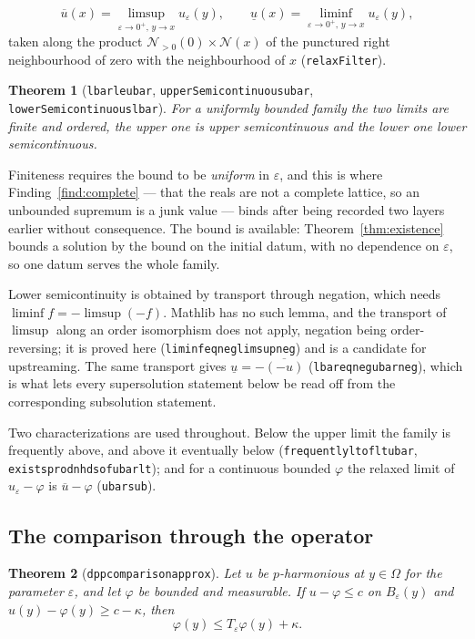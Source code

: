 \documentclass[11pt,reqno]{amsart}
\newcommand{\LEANREF}[1]{\texttt{\small\def\_{\textunderscore\allowbreak}#1}}
\newcommand{\eps}{\varepsilon}
\newcommand{\Op}{T_\eps}
\theoremstyle{plain}
\newtheorem{theorem}{Theorem}[section]
\theoremstyle{definition}
\begin{document}
\[
  \overline{u}(x) = \limsup_{\eps\to 0^+,\, y\to x} u_\eps(y),
  \qquad
  \underline{u}(x) = \liminf_{\eps\to 0^+,\, y\to x} u_\eps(y),
\]
taken along the product $\mathcal{N}_{>0}(0) \times \mathcal{N}(x)$ of the
punctured right neighbourhood of zero with the neighbourhood of $x$
(\LEANREF{relaxFilter}).

\begin{theorem}[\LEANREF{lbar\_le\_ubar},
\LEANREF{upperSemicontinuous\_ubar}, \LEANREF{lowerSemicontinuous\_lbar}]
\label{thm:relaxed}
For a uniformly bounded family the two limits are finite and ordered, the
upper one is upper semicontinuous and the lower one lower semicontinuous.
\end{theorem}

Finiteness requires the bound to be \emph{uniform} in $\eps$, and this is
where Finding~\ref{find:complete} --- that the reals are not a complete
lattice, so an unbounded supremum is a junk value --- binds after being
recorded two layers earlier without consequence. The bound is available:
Theorem~\ref{thm:existence} bounds a solution by the bound on the initial
datum, with no dependence on $\eps$, so one datum serves the whole family.

Lower semicontinuity is obtained by transport through negation, which needs
$\liminf f = -\limsup(-f)$. Mathlib has no such lemma, and the transport of
$\limsup$ along an order isomorphism does not apply, negation being
order-reversing; it is proved here (\LEANREF{liminf\_eq\_neg\_limsup\_neg})
and is a candidate for upstreaming. The same transport gives
$\underline{u} = -\overline{(-u)}$ (\LEANREF{lbar\_eq\_neg\_ubar\_neg}), which
is what lets every supersolution statement below be read off from the
corresponding subsolution statement.

Two characterizations are used throughout. Below the upper limit the family is
frequently above, and above it eventually below
(\LEANREF{frequently\_lt\_of\_lt\_ubar}, \LEANREF{exists\_prod\_nhds\_of\_ubar\_lt});
and for a continuous bounded $\varphi$ the relaxed limit of $u_\eps - \varphi$
is $\overline{u} - \varphi$ (\LEANREF{ubar\_sub}).

\subsection{The comparison through the operator}\label{ssec:cmp4}

\begin{theorem}[\LEANREF{dpp\_comparison\_approx}]\label{thm:approxcmp}
Let $u$ be $p$-harmonious at $y \in \Omega$ for the parameter $\eps$, and let
$\varphi$ be bounded and measurable. If $u - \varphi \le c$ on $B_\eps(y)$ and
$u(y) - \varphi(y) \ge c - \kappa$, then
\[
  \varphi(y) \le \Op\varphi(y) + \kappa .
\]
\end{theorem}
\end{document}
